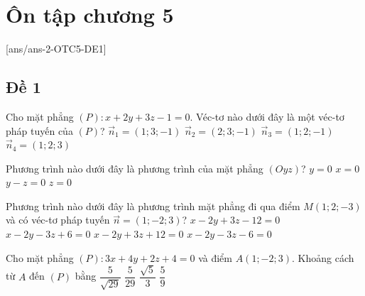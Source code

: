 \section{Ôn tập chương 5}
[ans/ans-2-OTC5-DE1]
\subsection{Đề 1}
\caulc
\begin{ex}%
	Cho mặt phẳng $(P)\colon x+2 y+3 z-1=0$. Véc-tơ nào dưới đây là một véc-tơ pháp tuyến của $(P)$?
	\choice
	{$\overrightarrow{n}_1=(1 ; 3 ;-1)$}
	{$\overrightarrow{n}_2=(2 ; 3 ;-1)$}
	{$\overrightarrow{n}_3=(1 ; 2 ;-1)$}
	{\True $\overrightarrow{n}_4=(1 ; 2 ; 3)$}
\end{ex}
\begin{ex}%
	Phương trình nào dưới đây là phương trình của mặt phẳng $(Oyz)$?
	\choice
	{$y=0$}
	{\True $x=0$}
	{$y-z=0$}
	{$z=0$}
\end{ex}
\begin{ex}%
	Phương trình nào dưới đây là phương trình mặt phẳng đi qua điểm $M(1 ; 2 ;-3)$ và có véc-tơ pháp tuyến $\overrightarrow{n}=(1 ;-2 ; 3)$?
	\choice
	{$x-2 y+3 z-12=0$}
	{$x-2 y-3 z+6=0$}
	{\True $x-2 y+3 z+12=0$}
	{$x-2 y-3 z-6=0$}
\end{ex}
\begin{ex}%
	Cho mặt phẳng $(P)\colon 3 x+4 y+2 z+4=0$ và điểm $A(1 ;-2 ; 3)$. Khoảng cách từ $A$ đến $(P)$ bằng
	\choice
	{\True $\dfrac{5}{\sqrt{29}}$}
	{$\dfrac{5}{29}$}
	{$\dfrac{\sqrt{5}}{3}$}
	{$\dfrac{5}{9}$}
\end{ex}
